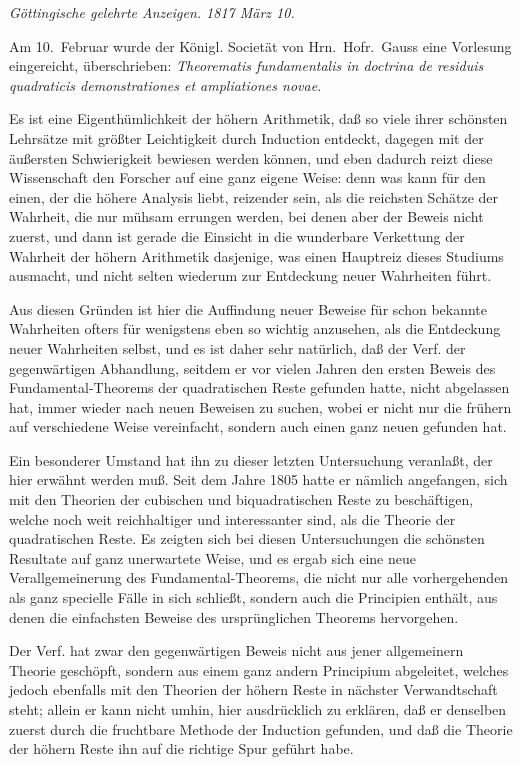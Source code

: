 \documentclass[12pt,a4paper]{article}
\theoremstyle{plain}
\theoremstyle{definition}
\theoremstyle{remark}
\begin{document}
\textit{Göttingische gelehrte Anzeigen. 1817 März 10.}

Am 10.~Februar wurde der Königl. Societät von Hrn.~Hofr.~Gauss eine Vorlesung eingereicht, überschrieben: \textit{Theorematis fundamentalis in doctrina de residuis quadraticis demonstrationes et ampliationes novae.}

Es ist eine Eigenthümlichkeit der höhern Arithmetik, daß so viele ihrer schönsten Lehrsätze mit größter Leichtigkeit durch Induction entdeckt, dagegen mit der äußersten Schwierigkeit bewiesen werden können, und eben dadurch reizt diese Wissenschaft den Forscher auf eine ganz eigene Weise: denn was kann für den einen, der die höhere Analysis liebt, reizender sein, als die reichsten Schätze der Wahrheit, die nur mühsam errungen werden, bei denen aber der Beweis nicht zuerst, und dann ist gerade die Einsicht in die wunderbare Verkettung der Wahrheit der höhern Arithmetik dasjenige, was einen Hauptreiz dieses Studiums ausmacht, und nicht selten wiederum zur Entdeckung neuer Wahrheiten führt.

Aus diesen Gründen ist hier die Auffindung neuer Beweise für schon bekannte Wahrheiten ofters für wenigstens eben so wichtig anzusehen, als die Entdeckung neuer Wahrheiten selbst, und es ist daher sehr natürlich, daß der Verf. der gegenwärtigen Abhandlung, seitdem er vor vielen Jahren den ersten Beweis des Fundamental-Theorems der quadratischen Reste gefunden hatte, nicht abgelassen hat, immer wieder nach neuen Beweisen zu suchen, wobei er nicht nur die frühern auf verschiedene Weise vereinfacht, sondern auch einen ganz neuen gefunden hat.

Ein besonderer Umstand hat ihn zu dieser letzten Untersuchung veranlaßt, der hier erwähnt werden muß. Seit dem Jahre 1805 hatte er nämlich angefangen, sich mit den Theorien der cubischen und biquadratischen Reste zu beschäftigen, welche noch weit reichhaltiger und interessanter sind, als die Theorie der quadratischen Reste. Es zeigten sich bei diesen Untersuchungen die schönsten Resultate auf ganz unerwartete Weise, und es ergab sich eine neue Verallgemeinerung des Fundamental-Theorems, die nicht nur alle vorhergehenden als ganz specielle Fälle in sich schließt, sondern auch die Principien enthält, aus denen die einfachsten Beweise des ursprünglichen Theorems hervorgehen.

Der Verf. hat zwar den gegenwärtigen Beweis nicht aus jener allgemeinern Theorie geschöpft, sondern aus einem ganz andern Principium abgeleitet, welches jedoch ebenfalls mit den Theorien der höhern Reste in nächster Verwandtschaft steht; allein er kann nicht umhin, hier ausdrücklich zu erklären, daß er denselben zuerst durch die fruchtbare Methode der Induction gefunden, und daß die Theorie der höhern Reste ihn auf die richtige Spur geführt habe.
\end{document}
